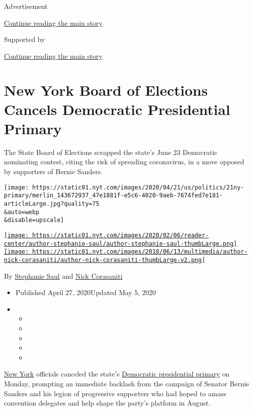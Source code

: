 Advertisement

\protect\hyperlink{after-top}{Continue reading the main story}

Supported by

\protect\hyperlink{after-sponsor}{Continue reading the main story}

\hypertarget{new-york-board-of-elections-cancels-democratic-presidential-primary}{%
\section{New York Board of Elections Cancels Democratic Presidential
Primary}\label{new-york-board-of-elections-cancels-democratic-presidential-primary}}

The State Board of Elections scrapped the state's June 23 Democratic
nominating contest, citing the risk of spreading coronavirus, in a move
opposed by supporters of Bernie Sanders.

\texttt{[image: https://static01.nyt.com/images/2020/04/21/us/politics/21ny-primary/merlin\_143672937\_47e1881f-e5c6-4020-9aeb-7674fed7e181-articleLarge.jpg?quality=75\\\&auto=webp\\\&disable=upscale]}

\href{https://www.nytimes.com/by/stephanie-saul}{\texttt{[image: https://static01.nyt.com/images/2020/02/06/reader-center/author-stephanie-saul/author-stephanie-saul-thumbLarge.png]}}\href{https://www.nytimes.com/by/nick-corasaniti}{\texttt{[image: https://static01.nyt.com/images/2018/06/13/multimedia/author-nick-corasaniti/author-nick-corasaniti-thumbLarge-v2.png]}}

By \href{https://www.nytimes.com/by/stephanie-saul}{Stephanie Saul} and
\href{https://www.nytimes.com/by/nick-corasaniti}{Nick Corasaniti}

\begin{itemize}
\item
  Published April 27, 2020Updated May 5, 2020
\item
  \begin{itemize}
  \item
  \item
  \item
  \item
  \item
  \end{itemize}
\end{itemize}

\href{https://www.nytimes.com/2020/05/05/us/politics/ny-presidential-primary.html}{New
York} officials canceled the state's
\href{https://www.nytimes.com/2020/06/22/nyregion/ny-primary-2020.html}{Democratic
presidential primary} on Monday, prompting an immediate backlash from
the campaign of Senator Bernie Sanders and his legion of progressive
supporters who had hoped to amass convention delegates and help shape
the party's platform in August.

